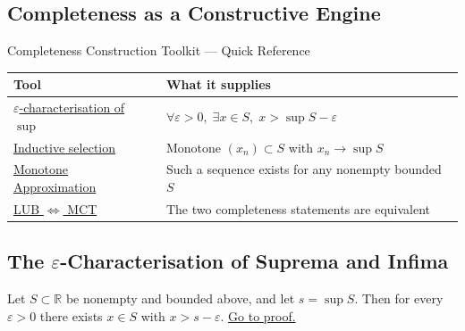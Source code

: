 
\subsection{Completeness as a Constructive Engine}
\label{sec:completeness-construction}

\begin{toolkitbox}{Completeness Construction Toolkit --- Quick Reference}
\small
\begin{tabular}{l l}
\toprule
\textbf{Tool}  & \textbf{What it supplies} \\
\midrule
\hyperref[prop:eps-char-sup]{$\varepsilon$-characterisation of $\sup$}
   & $\forall\varepsilon>0,\;\exists x\in S,\;x>\sup S-\varepsilon$
  \\[3pt]
\hyperref[thm:inductive-selection]{Inductive selection}
   & Monotone $(x_n)\subset S$ with $x_n\to\sup S$
  \\[3pt]
\hyperref[prop:monotone-approx-bounds]{Monotone Approximation}
   & Such a sequence exists for any nonempty bounded $S$
  \\[3pt]
\hyperref[thm:LUB-iff-MCT]{LUB $\Leftrightarrow$ MCT}
   & The two completeness statements are equivalent
  \\
\bottomrule
\end{tabular}
\end{toolkitbox}

\subsection*{\texorpdfstring{The $\varepsilon$-Characterisation of Suprema and Infima}{The epsilon-Characterisation of Suprema and Infima}}
\label{subsec:eps-char}

\begin{proposition}
\label{prop:eps-char-sup}
Let $S\subset\mathbb{R}$ be nonempty and bounded above, and let
$s=\sup S$. Then for every $\varepsilon>0$ there exists $x\in S$ with
$x>s-\varepsilon$.
\hyperref[prf:eps-char-sup]{Go to proof.}
\end{proposition}

